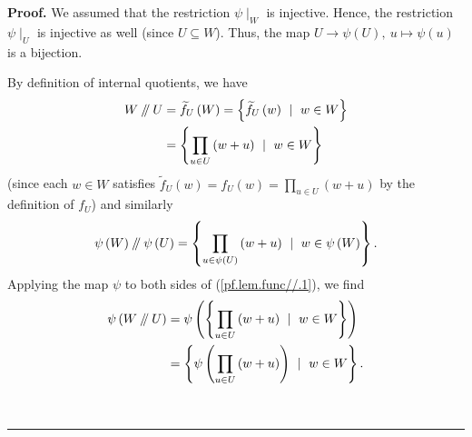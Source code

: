 \documentclass[numbers=enddot,12pt,final,onecolumn,notitlepage]{scrartcl}%
\numberwithin{exer}{section}
\theoremstyle{definition}
\newenvironment{proof}[1][Proof]{\noindent\textbf{#1.} }{\ \rule{0.5em}{0.5em}}
\let\prodnonlimits\prod
\renewcommand{\prod}{\prodnonlimits\limits}
\newcommand{\sslash}{\mathbin{/\mkern-5mu/}}
\theoremstyle{plainsl}
\begin{document}
\begin{proof}
We assumed that the restriction $\psi\mid_{W}$ is injective. Hence, the
restriction $\psi\mid_{U}$ is injective as well (since $U\subseteq W$). Thus,
the map $U\rightarrow\psi\left(  U\right)  ,\ u\mapsto\psi\left(  u\right)  $
is a bijection.

By definition of internal quotients, we have
\begin{align}
W\sslash U  &  =\widetilde{f}_{U}\left(  W\right)  =\left\{  \widetilde{f}%
_{U}\left(  w\right)  \ \mid\ w\in W\right\} \nonumber\\
&  =\left\{  \prod_{u\in U}\left(  w+u\right)  \ \mid\ w\in W\right\}
\label{pf.lem.func//.1}%
\end{align}
(since each $w\in W$ satisfies $\widetilde{f}_{U}\left(  w\right)
=f_{U}\left(  w\right)  =\prod_{u\in U}\left(  w+u\right)  $ by the definition
of $f_{U}$) and similarly%
\begin{equation}
\psi\left(  W\right)  \sslash \psi\left(  U\right)  =\left\{  \prod_{u\in
\psi\left(  U\right)  }\left(  w+u\right)  \ \mid\ w\in\psi\left(  W\right)
\right\}  . \label{pf.lem.func//.2}%
\end{equation}
Applying the map $\psi$ to both sides of (\ref{pf.lem.func//.1}), we find%
\begin{align}
\psi\left(  W\sslash U\right)   &  =\psi\left(  \left\{  \prod_{u\in U}\left(
w+u\right)  \ \mid\ w\in W\right\}  \right) \nonumber\\
&  =\left\{  \psi\left(  \prod_{u\in U}\left(  w+u\right)  \right)
\ \mid\ w\in W\right\}  . \label{pf.lem.func//.3}%
\end{align}



\end{proof}
\end{document}
